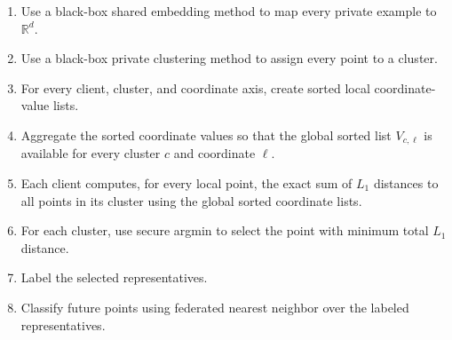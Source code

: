 \documentclass{article}
\begin{document}
\begin{enumerate}
    \item Use a black-box shared embedding method to map every private example to $\mathbb{R}^d$.
    \item Use a black-box private clustering method to assign every point to a cluster.
    \item For every client, cluster, and coordinate axis, create sorted local coordinate-value lists.
    \item Aggregate the sorted coordinate values so that the global sorted list $V_{c,\ell}$ is available for every cluster $c$ and coordinate $\ell$.
    \item Each client computes, for every local point, the exact sum of $L_1$ distances to all points in its cluster using the global sorted coordinate lists.
    \item For each cluster, use secure argmin to select the point with minimum total $L_1$ distance.
    \item Label the selected representatives.
    \item Classify future points using federated nearest neighbor over the labeled representatives.
\end{enumerate}
\end{document}
